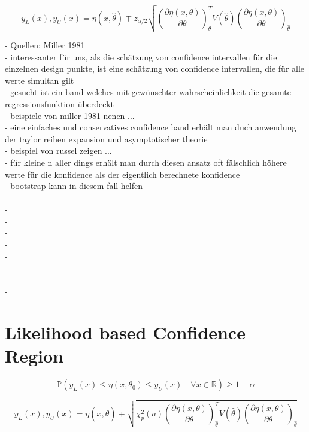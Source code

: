 \begin{equation}
y_L(x), y_U(x) = \eta(x, \hat\theta) \mp 
z_{\alpha/2} 
\sqrt{
  \left( 
    \frac{\partial\eta(x, \theta)}{\partial\theta} 
  \right)_{\hat\theta}^T 
  V(\hat\theta) 
  \left( 
    \frac{\partial\eta(x, \theta)}{\partial\theta} 
  \right)_{\hat\theta}
}
\end{equation}

- Quellen: Miller 1981\\
- interessanter für uns, als die schätzung von confidence intervallen für die einzelnen design punkte, ist eine schätzung von confidence intervallen, die für alle werte simultan gilt\\
- gesucht ist ein band welches mit gewünschter wahrscheinlichkeit die gesamte regressionsfunktion überdeckt\\
- beispiele von miller 1981 nenen ...\\
- eine einfaches und conservatives confidence band erhält man duch anwendung der taylor reihen expansion und asymptotischer theorie\\
- beispiel von russel zeigen ...\\
- für kleine n aller dings erhält man durch diesen ansatz oft fälschlich höhere werte für die konfidence als der eigentlich berechnete konfidence\\
- bootstrap kann in diesem fall helfen\\
- \\
- \\
- \\
- \\
- \\
- \\
- \\
- \\
- \\

\section{Likelihood based Confidence Region}
\begin{equation}
\mathbb{P} \left(
  y_L(x) \le \eta(x, \theta_0) \le y_U(x) 
  \quad \forall x \in \mathbb{R}
\right) \geq 1-\alpha
\end{equation}

\begin{equation}
y_L(x), y_U(x) = \eta(x, \hat\theta) \mp 
\sqrt{
  \chi_p^2(a)
  \left( 
    \frac{\partial\eta(x, \theta)}{\partial\theta} 
  \right)_{\hat\theta}^T 
  V(\hat\theta) 
  \left( 
    \frac{\partial\eta(x, \theta)}{\partial\theta} 
  \right)_{\hat\theta}
}
\end{equation}

